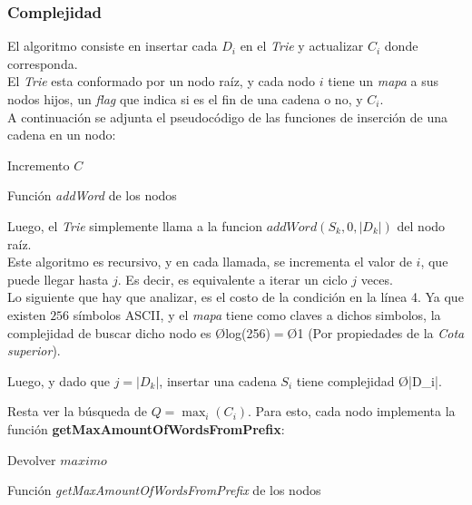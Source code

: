 \subsubsection{Complejidad}
El algoritmo consiste en insertar cada $D_i$ en el \emph{Trie} y actualizar $C_i$ donde corresponda.\\
El \emph{Trie} esta conformado por un nodo raíz, y cada nodo $i$ tiene un \emph{mapa} a sus nodos hijos, un \emph{flag} que indica si es el fin de una cadena o no, y $C_i$.\\
A continuación se adjunta el pseudocódigo de las funciones de inserción de una cadena en un nodo:\\
\begin{algorithm}[H]

	Incremento $C$

	\caption{Función \emph{addWord} de los nodos}
\end{algorithm}

Luego, el \emph{Trie} simplemente llama a la funcion $addWord(S_k, 0, |D_k|)$ del nodo raíz.\\
Este algoritmo es recursivo, y en cada llamada, se incrementa el valor de $i$, que puede llegar hasta $j$. Es decir, es equivalente a iterar un ciclo $j$ veces.\\
Lo siguiente que hay que analizar, es el costo de la condición en la línea 4. Ya que existen $256$ símbolos ASCII, y el \emph{mapa} tiene como claves a dichos simbolos, la complejidad de buscar dicho nodo es \O{log(256)}$=$\O{1} (Por propiedades de la \emph{Cota superior}).

Luego, y dado que $j = |D_k|$, insertar una cadena $S_i$ tiene complejidad \O{|D_i|}.

Resta ver la búsqueda de $\displaystyle Q = \operatorname*{max}_{i} (C_i)$. Para esto, cada nodo implementa la función \textbf{getMaxAmountOfWordsFromPrefix}:\\
\begin{algorithm}[H]

	Devolver $maximo$

	\caption{Función \emph{getMaxAmountOfWordsFromPrefix} de los nodos}
\end{algorithm}

